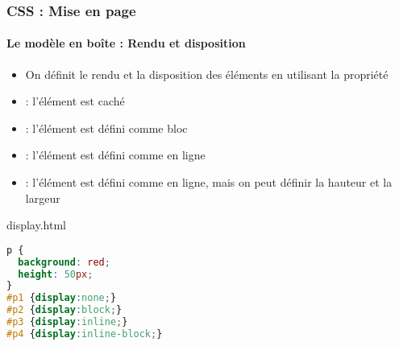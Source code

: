 \documentclass[xcolor=table]{beamer}
\begin{document}
\begin{frame}[fragile]
\frametitle{CSS : Mise en page}
\framesubtitle{Le modèle en boîte : Rendu et disposition}

\begin{minipage}{0.60\textwidth}
	\begin{itemize}
		\item On définit le rendu et la disposition des éléments en utilisant la propriété 
		\item {} : l'élément est caché
		\item {} : l'élément est défini comme bloc
		\item {} : l'élément est défini comme en ligne
		\item {} : l'élément est défini comme en ligne, mais on peut définir la hauteur et la largeur
	\end{itemize}
\end{minipage}
%
\begin{minipage}{0.38\textwidth}
\begin{block}{display.html}
\lstset{escapeinside=**}
\scriptsize\bfseries
\begin{lstlisting}[language={CSS}]
p {
  background: red;
  height: 50px;
}
#p1 {display:none;}
#p2 {display:block;}
#p3 {display:inline;}
#p4 {display:inline-block;}
\end{lstlisting}
\end{block}
\end{minipage}
\end{frame}
\end{document}
